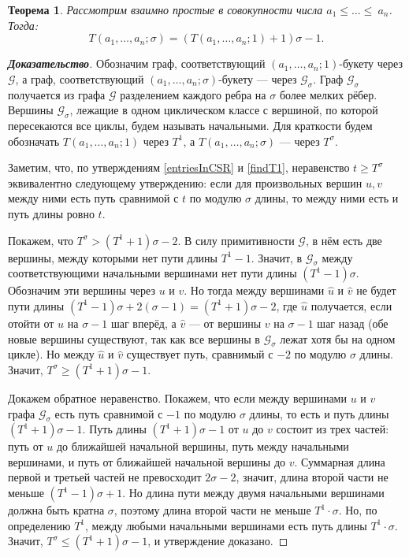 \documentclass[12pt]{article}
\newtheorem{theorem}{Теорема}[section]
\theoremstyle{definition}
\begin{document}
\begin{theorem}
\label{everyKFormula}
Рассмотрим взаимно простые в совокупности числа $a_1 \le \dots \le ~a_n$. Тогда:
\begin{equation*}
T(a_1, \dots, a_n; \sigma) = (T(a_1, \dots, a_n; 1) + 1)\sigma - 1.
\end{equation*}
\end{theorem}
\begin{proof}[\textbf{Доказательство}] 
Обозначим граф, соответствующий $(a_1, \dots, a_n; 1)$-букету через $\mathcal{G}$, а граф, соответствующий $(a_1, \dots, a_n; \sigma)$-букету --- через $\mathcal{G}_\sigma$. Граф $\mathcal{G}_\sigma$ получается из графа $\mathcal{G}$ разделением каждого ребра на $\sigma$ более мелких рёбер. Вершины $\mathcal{G}_\sigma$, лежащие в одном циклическом классе с вершиной, по которой пересекаются все циклы, будем называть начальными. Для краткости будем обозначать $T(a_1, \dots, a_n; 1)$ через $T^1$, а $T(a_1, \dots, a_n; \sigma)$ --- через $T^{\sigma}$.

Заметим, что, по утверждениям \ref{entriesInCSR} и \ref{findT1}, неравенство $t \ge T^{\sigma}$ эквивалентно следующему утверждению: если для произвольных вершин $u, v$ между ними есть путь сравнимой с $t$ по модулю $\sigma$ длины, то между ними есть и путь длины ровно $t$.

Покажем, что $T^{\sigma} > (T^1 + 1)\sigma - 2$. В силу примитивности $\mathcal{G}$, в нём есть две вершины, между которыми нет пути длины $T^1 - 1$. Значит, в $\mathcal{G}_\sigma$ между соответствующими начальными вершинами нет пути длины $(T^1 - 1)\sigma$. Обозначим эти вершины через $u$ и $v$. Но тогда между вершинами $\hat{u}$ и $\hat{v}$ не будет пути длины $(T^1 - 1)\sigma + 2(\sigma - 1) = (T^1 + 1)\sigma - 2$, где $\hat{u}$ получается, если отойти от $u$ на $\sigma - 1$  шаг вперёд, а $\hat{v}$ --- от вершины $v$ на $\sigma - 1$ шаг назад (обе новые вершины существуют, так как все вершины в $\mathcal{G}_{\sigma}$ лежат хотя бы на одном цикле). Но между $\hat{u}$ и $\hat{v}$ существует путь, сравнимый с $-2$ по модулю $\sigma$ длины. Значит, $T^{\sigma} \ge (T^1 + 1)\sigma - 1$.

Докажем обратное неравенство. Покажем, что если между вершинами $u$ и $v$ графа $\mathcal{G}_\sigma$ есть путь сравнимой с $-1$ по модулю $\sigma$ длины, то есть и путь длины $(T^1 + 1)\sigma - 1$. Путь длины $(T^1 + 1)\sigma - 1$ от $u$ до $v$ состоит из трех частей: путь от $u$ до ближайшей начальной вершины, путь между начальными вершинами, и путь от ближайшей начальной вершины до $v$. Суммарная длина первой и третьей частей не превосходит $2\sigma - 2$, значит, длина второй части не меньше $(T^1 - 1)\sigma + 1$. Но длина пути между двумя начальными вершинами должна быть кратна $\sigma$, поэтому длина второй части не меньше $T^1\cdot \sigma$. Но, по определению $T^1$, между любыми начальными вершинами есть путь длины $T^1\cdot \sigma$. Значит, $T^{\sigma} \le (T^1 + 1)\sigma - 1$, и утверждение доказано.
\end{proof}
\end{document}
